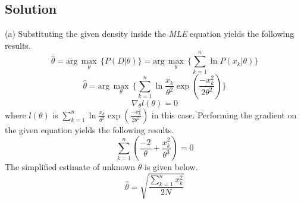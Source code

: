 \documentclass[12pt]{article}
\numberwithin{equation}{section}
\numberwithin{table}{section}
\numberwithin{figure}{section}
\begin{document}
\subsection*{Solution}
(a) Substituting the given density inside the \textit{MLE} equation yields the following results.
\begin{equation}
	\hat{\theta} = \text{arg}\,\max\limits_{\theta}\, \{P(D|\theta)\} = \text{arg}\,\max\limits_{\theta}\, \{\sum_{k = 1}^{n} \ln P(x_k|\theta)\} 
\end{equation}
$$
	\hat{\theta} = \text{arg}\,\max\limits_{\theta}\, \{\sum_{k = 1}^{n} \ln \frac{x_k}{\theta^2}\exp(\frac{-x_k^2}{2\theta^2})\}
$$
$$
	\nabla_{\theta}l(\theta) = 0 
$$
where $l(\theta)$ is $\sum_{k = 1}^{n} \ln \frac{x_k}{\theta^2}\exp(\frac{-x_k^2}{2\theta^2})$ in this case. Performing the gradient on the given equation yields the following results.
$$
	\sum_{k = 1}^{n} (\frac{-2}{\theta} + \frac{x_k^2}{\theta^3}) = 0
$$
The simplified estimate of unknown $\theta$ is given below.
$$
	\hat{\theta} = \sqrt{\frac{\sum_{k = 1}^{n} x_k^2}{2N}}
$$
\end{document}

